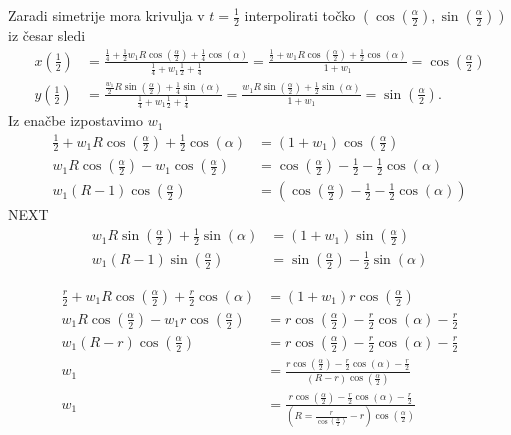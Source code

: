 \documentclass[isrm2, tisk]{fmfdelo}
\begin{document}
    Zaradi simetrije mora krivulja v $t=\frac{1}{2}$ interpolirati točko $\left(\cos\left(\frac{\alpha}{2}\right),\sin\left(\frac{\alpha}{2}\right)\right)$ iz česar sledi
    \begin{align*}
        x\left(\frac{1}{2}\right) &= \frac{\frac{1}{4} +  \frac{1}{2}w_1R\cos\left(\frac{\alpha}{2}\right) + \frac{1}{4}\cos(\alpha)}{\frac{1}{4}+ w_1\frac{1}{2} + \frac{1}{4}} = \frac{ \frac{1}{2} + w_1R\cos\left(\frac{\alpha}{2}\right) + \frac{1}{2}\cos(\alpha)}{1+w_1} = \cos\left(\frac{\alpha}{2}\right) \\
        y\left(\frac{1}{2}\right) &= \frac{\frac{w_1}{2}R\sin\left(\frac{\alpha}{2}\right) + \frac{1}{4}\sin(\alpha)}{\frac{1}{4}+ w_1\frac{1}{2} + \frac{1}{4}} =  \frac{w_1R\sin\left(\frac{\alpha}{2}\right) + \frac{1}{2}\sin(\alpha)}{1+w_1} = \sin\left(\frac{\alpha}{2}\right).
    \end{align*}
    Iz enačbe izpostavimo $w_1$
    \begin{align*}
        \frac{1}{2} + w_1R\cos\left(\frac{\alpha}{2}\right) + \frac{1}{2}\cos(\alpha) &= (1+w_1)\cos\left(\frac{\alpha}{2}\right) \\
        w_1R\cos\left(\frac{\alpha}{2}\right) - w_1\cos\left(\frac{\alpha}{2}\right) &= \cos\left(\frac{\alpha}{2}\right)-\frac{1}{2} - \frac{1}{2}\cos(\alpha) \\
        w_1(R-1)\cos\left(\frac{\alpha}{2}\right) &= \left(\cos\left(\frac{\alpha}{2}\right)-\frac{1}{2} - \frac{1}{2}\cos(\alpha)\right)
    \end{align*}
    NEXT
    \begin{align*}
        w_1R\sin\left(\frac{\alpha}{2}\right) + \frac{1}{2}\sin(\alpha) &= (1+w_1)\sin\left(\frac{\alpha}{2}\right) \\
        w_1(R-1)\sin\left(\frac{\alpha}{2}\right)  &= \sin\left(\frac{\alpha}{2}\right) - \frac{1}{2}\sin(\alpha)
    \end{align*}

    \begin{align*}
        \frac{r}{2} + w_1R\cos\left(\frac{\alpha}{2}\right) + \frac{r}{2}\cos(\alpha) &=(1+w_1) r\cos\left(\frac{\alpha}{2}\right) \\
        w_1R\cos\left(\frac{\alpha}{2}\right) - w_1r\cos\left(\frac{\alpha}{2}\right) &= r\cos\left(\frac{\alpha}{2}\right)-\frac{r}{2}\cos(\alpha)-\frac{r}{2} \\
        w_1(R-r)\cos\left(\frac{\alpha}{2}\right) &= r\cos\left(\frac{\alpha}{2}\right)-\frac{r}{2}\cos(\alpha)-\frac{r}{2} \\
        w_1 &=\frac{r\cos\left(\frac{\alpha}{2}\right)-\frac{r}{2}\cos(\alpha)-\frac{r}{2}}{(R-r)\cos\left(\frac{\alpha}{2}\right)}\\
        w_1 &=\frac{r\cos\left(\frac{\alpha}{2}\right)-\frac{r}{2}\cos(\alpha)-\frac{r}{2}}{(R=\frac{r}{\cos\left(\frac{\alpha}{2}\right)}-r)\cos\left(\frac{\alpha}{2}\right)}
    \end{align*}
\end{document}
